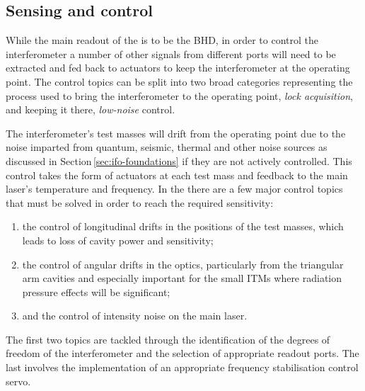 % 
% 

\subsection{\label{sec:ssm-sensing-and-control}Sensing and control}
While the main readout of the \SSMEXPT{} is to be the \gls{BHD}, in order to control the interferometer a number of other signals from different ports will need to be extracted and fed back to actuators to keep the interferometer at the operating point. The control topics can be split into two broad categories representing the process used to bring the interferometer to the operating point, \emph{lock acquisition}, and keeping it there, \emph{low-noise} control.

The interferometer's test masses will drift from the operating point due to the noise imparted from quantum, seismic, thermal and other noise sources as discussed in Section\,\ref{sec:ifo-foundations} if they are not actively controlled. This control takes the form of actuators at each test mass and feedback to the main laser's temperature and frequency. In the \SSMEXPT{} there are a few major control topics that must be solved in order to reach the required sensitivity:
\begin{enumerate}
  \item the control of longitudinal drifts in the positions of the test masses, which leads to loss of cavity power and sensitivity;
  \item the control of angular drifts in the optics, particularly from the triangular arm cavities and especially important for the small \glspl{ITM} where radiation pressure effects will be significant;
  \item and the control of intensity noise on the main laser.
\end{enumerate}
The first two topics are tackled through the identification of the degrees of freedom of the interferometer and the selection of appropriate readout ports. The last involves the implementation of an appropriate frequency stabilisation control servo.

